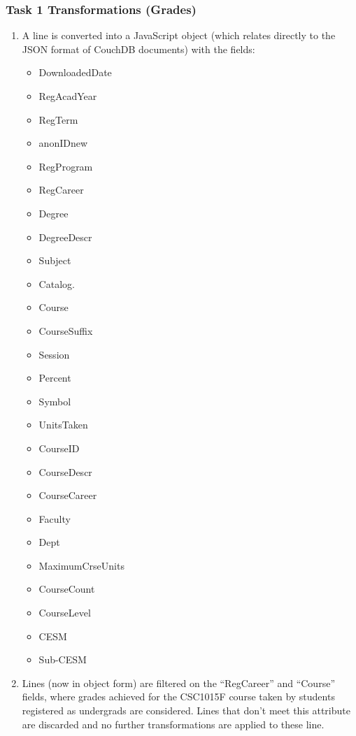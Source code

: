 \subsubsection{Task 1 Transformations (Grades)}
\begin{enumerate}
  \item A line is converted into a JavaScript object (which relates directly to the JSON format of CouchDB documents) with the fields:
        \begin{itemize}
          \item DownloadedDate
          \item RegAcadYear
          \item RegTerm
          \item anonIDnew
          \item RegProgram
          \item RegCareer
          \item Degree
          \item DegreeDescr
          \item Subject
          \item Catalog.
          \item Course
          \item CourseSuffix
          \item Session
          \item Percent
          \item Symbol
          \item UnitsTaken
          \item CourseID
          \item CourseDescr
          \item CourseCareer
          \item Faculty
          \item Dept
          \item MaximumCrseUnits
          \item CourseCount
          \item CourseLevel
          \item CESM
          \item Sub-CESM
        \end{itemize}
  \item Lines (now in object form) are filtered on the ``RegCareer'' and ``Course'' fields, where grades achieved for the CSC1015F course taken by students registered as undergrads are considered. Lines that don't meet this attribute are discarded and no further transformations are applied to these line.

\end{enumerate}

